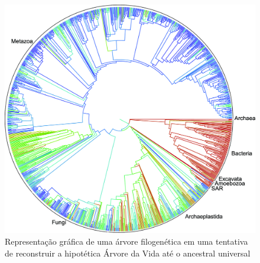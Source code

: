 \documentclass[english,brazilian]{UNISINOSmonografia} %
\begin{document}
\begin{figure}[tb]
\centering%
\begin{minipage}{.75\textwidth}
	\caption{Representação gráfica de uma árvore filogenética em uma tentativa de reconstruir a hipotética Árvore da Vida até o ancestral universal}
	\label{fig:treeoflife}
	\vspace{1ex}
	\includegraphics[width=\textwidth]{treeoflife}
\end{minipage}
\end{figure}





\end{document}
